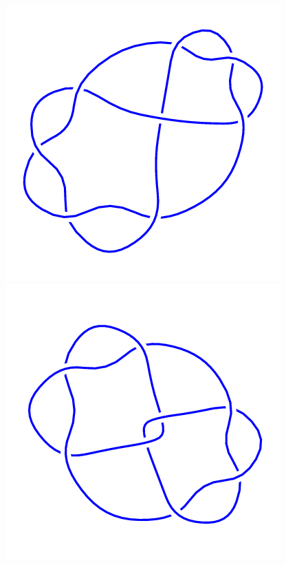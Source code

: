 \begin{figure}[H]
\begin{minipage}[b]{.18\linewidth}
	\end{minipage}
	\begin{minipage}[b]{.18\linewidth}
		\centering
		\includegraphics[width=\linewidth]{../data/8_4.png}
	\end{minipage}
	\begin{minipage}[b]{.18\linewidth}
		\centering
		\includegraphics[width=\linewidth]{../data/8_5.png}

\end{minipage}
\end{figure}
